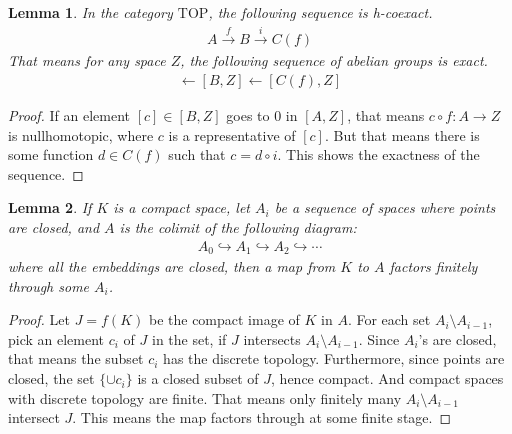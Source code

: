 \documentclass[12pt, notitlepage]{article}
\newtheorem{thm}{Theorem}[section]
\newtheorem{lem}[thm]{Lemma}
\theoremstyle{definition}
\newcommand{\cat}[1]{\mathrm{#1}}
\begin{document}
\begin{lem}
  In the category $\cat{TOP}$, the following sequence is h-coexact.
  \begin{align*}
    A \xrightarrow{f} B \xrightarrow{i} C(f)
  \end{align*}
  That means for any space $Z$, the following sequence of abelian groups is exact.
  \begin{align*}
    [A, Z] \leftarrow [B,Z] \leftarrow [C(f), Z]
  \end{align*}
\end{lem}

\begin{proof}
  If an element $[c] \in [B,Z]$ goes to $0$ in $[A, Z]$, that means $c \circ f: A \to Z$ is
  nullhomotopic, where $c$ is a representative of $[c]$. But that means there is some function
  $d \in C(f)$ such that $c = d \circ i$. This shows the exactness of the sequence.
\end{proof}

\begin{lem}
  If $K$ is a compact space, let $A_i$ be a sequence of spaces where points are closed, and $A$ is
  the colimit of the following diagram:
  \begin{align*}
    A_0 \hookrightarrow A_1 \hookrightarrow A_2 \hookrightarrow \cdots
  \end{align*}
  where all the embeddings are closed, then a map from $K$ to $A$ factors finitely through some
  $A_i$.
\end{lem}

\begin{proof}
  Let $J = f(K)$ be the compact image of $K$ in $A$. For each set $A_i \setminus A_{i-1}$, pick an
  element $c_i$ of $J$ in the set, if $J$ intersects $A_i \setminus A_{i-1}$. Since $A_i$'s are
  closed, that means the subset $c_i$ has the discrete topology. Furthermore, since points are
  closed, the set $\{\cup c_i\}$ is a closed subset of $J$, hence compact. And compact spaces with
  discrete topology are finite. That means only finitely many $A_i \setminus A_{i-1}$ intersect $J$.
  This means the map factors through at some finite stage.
\end{proof}


\end{document}
